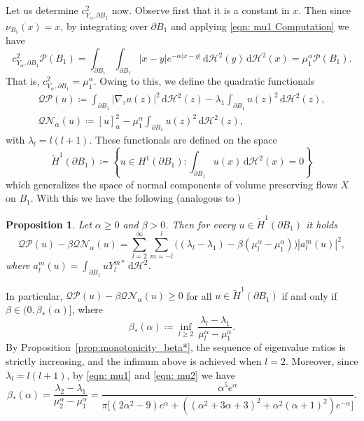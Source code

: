\documentclass[a4paper,11pt,reqno]{amsart}
\numberwithin{equation}{section}
\newtheorem{proposition}[theorem]{Proposition}
\theoremstyle{remark}
\theoremstyle{definition}
\newcommand{\dd}{\,\mathrm{d}}
\newcommand{\defeq}{\coloneqq}
\newcommand{\nl}{\mathcal{N}_{\alpha}}
\renewcommand{\geq}{\geqslant}
\newcommand{\Pe}{\mathcal{P}}
\begin{document}
Let us determine $c_{Y_{\alpha},\partial B_1}^2$ now. Observe first that it is a constant in $x$. Then since $\nu_{B_1}(x)=x$, by integrating over $\partial B_1$ and applying \eqref{eqn: mu1 Computation} we have
	\[
		c_{Y_{\alpha},\partial B_1}^2\Pe(B_1) = \int_{\partial B_1}\int_{\partial B_1}|x-y|e^{-\alpha|x-y|} \dd\mathcal{H}^2(y) \dd\mathcal{H}^2(x) = \mu_1^{\alpha}\Pe(B_1).
	\]
That is, $c_{Y_{\alpha}, \partial B_1}^2 = \mu_1^{\alpha}$. Owing to this, we define the quadratic functionals
	\begin{gather*}
		\mathcal{QP}(u)\defeq \int_{\partial B_1}|\nabla_{\tau}u(z)|^2 \dd\mathcal{H}^2(z) - \lambda_1\int_{\partial B_1} u(z)^2 \dd\mathcal{H}^2(z),  \\
		\mathcal{QN_{\alpha}}(u) \defeq [u]_{\alpha}^2- \mu_1^{\alpha} \int_{\partial B_1} u(z)^2 \dd\mathcal{H}^2(z),
	\end{gather*}
with $\lambda_l=l(l+1)$. These functionals are defined on the space
	\[
		\tilde{H}^1(\partial B_1)\defeq \left\lbrace u\in H^1(\partial B_1) \colon \int_{\partial B_1} u(x) \dd \mathcal{H}^2(x)=0\right\rbrace
	\]
which generalizes the space of normal components of volume preserving flows $X$ on $B_1$. With this we have the following (analogous to \cite[Proposition 7.2]{FFMMM})
	\begin{proposition}\label{prop:second_var}
		Let $\alpha\geq 0$ and $\beta> 0$. Then for every $u\in \tilde{H}^1(\partial B_1)$ it holds
		\begin{equation}\label{eqn:expansion}
			\mathcal{QP}(u)-\beta \mathcal{Q\nl}(u) = \sum_{l=2}^{\infty}\sum_{m=-l}^{l}\Big((\lambda_l - \lambda_1)-\beta(\mu_l^{\alpha} - \mu_1^\alpha)\Big) |a_l^m(u)|^2,
		\end{equation}
where $a_l^m(u) = \int_{\partial B_1}u Y_l^{m*} \dd\mathcal{H}^2$. 
	\end{proposition}
	
In particular, $\mathcal{QP}(u)-\beta \mathcal{Q\nl}(u)\geq 0$ for all $u\in \tilde{H}^1(\partial B_1)$ if and only if  $\beta \in (0,\beta_*(\alpha)]$, where
	\begin{equation}\label{eqn: beta* Definition}
		\beta_*(\alpha)\defeq \inf_{l\geq 2}\, \frac{\lambda_l-\lambda_1}{\mu_l^{\alpha}-\mu_1^{\alpha}}.
	\end{equation}
By Proposition~\ref{prop:monotonicity_beta*}, the sequence of eigenvalue ratios is strictly increasing, and the infimum above is achieved when $l=2$. Moreover, since $\lambda_l = l(l+1)$, by \eqref{eqn: mu1} and \eqref{eqn: mu2} we have 
		\begin{equation}\label{eqn: beta* Value}
			\beta_*(\alpha) = \frac{\lambda_2-\lambda_1}{\mu_2^{\alpha}-\mu_1^{\alpha}}  = \frac{\alpha^5 e^{\alpha}}{\pi\big[(2\alpha^2-9)e^{\alpha} + \left((\alpha^2+3\alpha+3)^2+\alpha^2(\alpha+1)^2\right)e^{-\alpha}\big]}.
		\end{equation}
\end{document}
